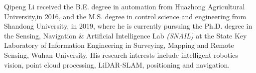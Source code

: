 \documentclass[lettersize,journal]{IEEEtran}
\begin{document}

 


\begin{IEEEbiography}{Qipeng Li}
received the B.E. degree in automation from Huazhong Agricultural University,in 2016, and the M.S. degree in control science and engineering from Shandong University, in 2019, where he is currently pursuing the Ph.D. degree in the Sensing, Navigation \& Artificial Intelligence Lab \emph{(SNAIL)} at the State Key Laboratory of Information Engineering in Surveying, Mapping and Remote Sensing, Wuhan University. His research interests include intelligent robotics vision, point cloud processing, LiDAR-SLAM, positioning and navigation.
\end{IEEEbiography}
\end{document}
